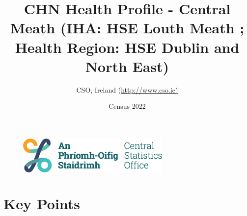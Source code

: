 \documentclass{article}
\title{CHN Health Profile - Central Meath (IHA: HSE Louth Meath ;  Health Region: HSE Dublin and North East) }
\date{Census 2022}
\author{CSO, Ireland  (\url{http://www.cso.ie)}}
\begin{document}


\begin{figure}
	\centering
\includegraphics[width =75mm]{../figures/CSO_Logo.png}
\end{figure}

				 
		   
						  
														  
																																													
												 
			 
\maketitle
					
													   
				 
						 
																																																																											   
				 
				  
  \pagebreak
    	    \tableofcontents

\pagebreak


\section{Key Points}
\end{document}
